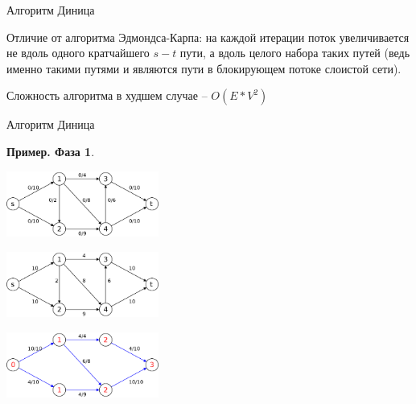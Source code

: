 \documentclass[10pt]{beamer}
\begin{document}
\begin{frame}[fragile]{Алгоритм Диница}

Отличие от алгоритма Эдмондса-Карпа: на каждой итерации поток увеличивается не вдоль одного кратчайшего $s-t$ пути, а вдоль целого набора таких путей (ведь именно такими путями и являются пути в блокирующем потоке слоистой сети).

Сложность алгоритма в худшем случае -- $O(E*V^2)$

\end{frame}

\begin{frame}[fragile]{Алгоритм Диница}

\textbf{Пример. Фаза 1}. 

\begin{center}
    \includegraphics[width=5cm]{Term_2/Source/images/8-dinica-1.png}
\end{center}
\begin{center}
    \includegraphics[width=5cm]{Term_2/Source/images/8-dinica-2.png}
\end{center}
\begin{center}
    \includegraphics[width=5cm]{Term_2/Source/images/8-dinica-3.png}
\end{center}
\end{frame}
\end{document}
